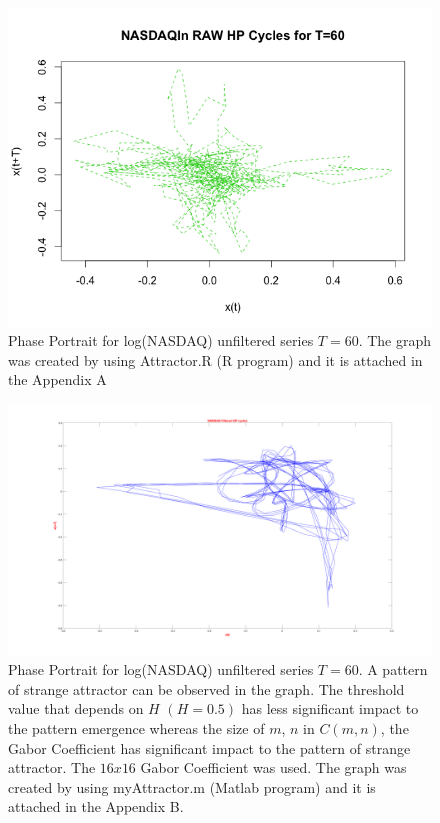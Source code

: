 \begin{figure}[!ht]
\includegraphics[scale=.7]{Images/NASDAQRawChaos}
\caption{Phase Portrait for log(NASDAQ) unfiltered series $T= 60$. The graph was created by using Attractor.R (R program) and it is attached in the Appendix A}
\label{fig:NASDAQRawChaos}
\end{figure}

\begin{figure}[!ht]
\includegraphics[scale=.15]{Images/NASFiltAttract}
\caption{Phase Portrait for log(NASDAQ) unfiltered series $T= 60$. A pattern of strange attractor can be observed in the graph. The threshold value that depends on $H$ $(H = 0.5)$ has less significant impact to the pattern emergence whereas the size of $m$, $n$ in $C(m,n)$, the Gabor Coefficient has significant impact to the pattern of strange attractor. The $16 x 16$ Gabor Coefficient was used. The graph was created by using myAttractor.m (Matlab program) and it is attached in the Appendix B.}
\label{fig:NASFiltAttract}
\end{figure}

